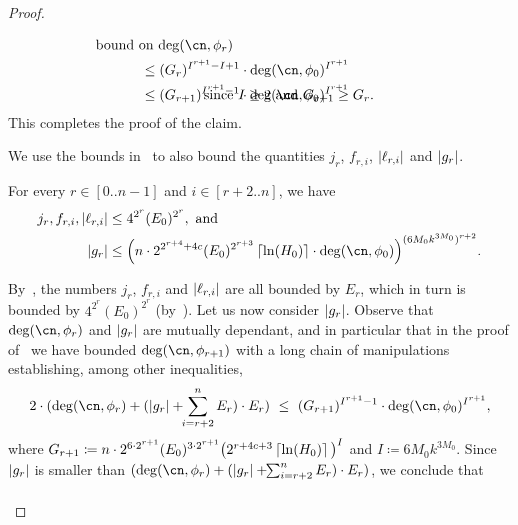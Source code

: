\begin{proof}
\begin{claimproof}
\begin{description}
\begin{align*}
          &\hspace{-1.6cm}\text{bound on $\deg(\cn,\phi_r)$}
          \\
          \leq{}& 
          (G_{r})^{I^{r+1}-I+1} \cdot \deg(\cn,\phi_0)^{I^{r+1}}
          \\
          \leq{}& 
          (G_{r+1})^{I^{r+1}-1} \cdot \deg(\cn,\phi_0)^{I^{r+1}}
          &\hspace{-4cm}\text{since $I \geq 2$ and $G_{r+1} \geq G_r$.}
        \end{align*}
        This completes the proof of the claim.
        \claimqedhere
    \end{description}
  \end{claimproof}
  We use the bounds in~ to also bound the quantities
  $j_r$, $f_{r,i}$, $\left|\ell_{r,i}\right|$ and $\left|g_r\right|$.
  \begin{claim}
    \label{claim:less-ugly-bounds}
    For every $r \in [0..n-1]$ and $i \in [r+2..n]$, we have
    \begin{align*}
      j_r,f_{r,i},\abs{\ell_{r,i}} &\leq 4^{2^r} (E_0)^{2^r}, \text{ and }\\ 
      \abs{g_r} &\leq \Big(n \cdot 2^{2^{r+4}+4c}(E_0)^{2^{r+3}} \ceil{\ln(H_0)} \cdot \deg(\cn,\phi_0) \Big)^{(6M_0k^{3M_0})^{r+2}}.
    \end{align*}
  \end{claim}
  \begin{claimproof}
    By~, 
    the numbers $j_r$, $f_{r,i}$ and $\left|\ell_{r,i}\right|$ 
    are all bounded by $E_r$, 
    which in turn is bounded by $4^{2^r} (E_0)^{2^r}$ 
    (by~).
    Let us now consider $\left|g_r\right|$.
    Observe that $\deg(\cn,\phi_r)$  and $\left|g_r\right|$ are mutually dependant, 
    and in particular that in the proof of~ 
    we have bounded $\deg(\cn,\phi_{r+1})$ with a long chain of manipulations establishing, among other inequalities, 
    \begin{align*}
        2 \cdot (\deg(\cn,\phi_r) + (\abs{g_r} +\!\!\sum_{i = r+2}^n E_r) \cdot E_r) \ \leq \ (G_{r+1})^{I^{r+1}-1} \cdot \deg(\cn,\phi_0)^{I^{r+1}},
    \end{align*}
    where $G_{r+1} \coloneqq n \cdot 2^{6 \cdot 2^{r+1}}(E_0)^{3 \cdot 2^{r+1}} \big(2^{r+4c+3} \left\lceil\ln(H_0)\right\rceil\big)^{I}$ and $I \coloneqq 6M_0k^{3M_0}$.
    Since $\left|g_r\right|$ is smaller than $(\deg(\cn,\phi_r) + (\abs{g_r} +\!\!\sum_{i = r+2}^n E_r) \cdot E_r)$, we conclude that 
    \begin{align*}

\end{align*}
\end{claimproof}
\end{proof}

